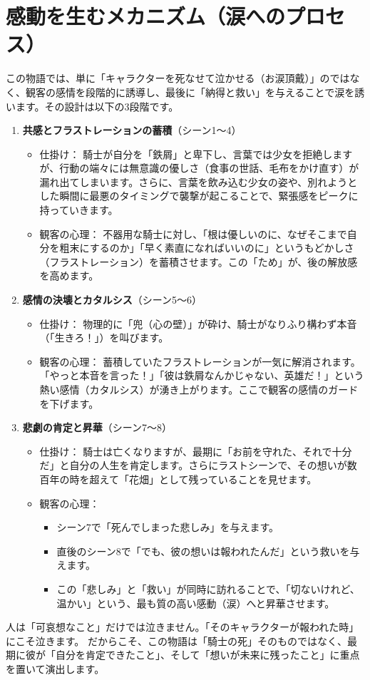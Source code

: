 \clearpage\section{感動を生むメカニズム（涙へのプロセス）}
この物語では、単に「キャラクターを死なせて泣かせる（お涙頂戴）」のではなく、観客の感情を段階的に誘導し、最後に「納得と救い」を与えることで涙を誘います。その設計は以下の3段階です。
\begin{enumerate}
    \item \textbf{共感とフラストレーションの蓄積}（シーン1〜4）
    \begin{itemize}
        \item 仕掛け： 騎士が自分を「鉄屑」と卑下し、言葉では少女を拒絶しますが、行動の端々には無意識の優しさ（食事の世話、毛布をかけ直す）が漏れ出てしまいます。さらに、言葉を飲み込む少女の姿や、別れようとした瞬間に最悪のタイミングで襲撃が起こることで、緊張感をピークに持っていきます。
        \item 観客の心理： 不器用な騎士に対し、「根は優しいのに、なぜそこまで自分を粗末にするのか」「早く素直になればいいのに」というもどかしさ（フラストレーション）を蓄積させます。この「ため」が、後の解放感を高めます。
    \end{itemize}
    \item \textbf{感情の決壊とカタルシス}（シーン5〜6）
    \begin{itemize}
        \item 仕掛け： 物理的に「兜（心の壁）」が砕け、騎士がなりふり構わず本音（「生きろ！」）を叫びます。
        \item 観客の心理： 蓄積していたフラストレーションが一気に解消されます。「やっと本音を言った！」「彼は鉄屑なんかじゃない、英雄だ！」という熱い感情（カタルシス）が湧き上がります。ここで観客の感情のガードを下げます。
    \end{itemize}
    \item \textbf{悲劇の肯定と昇華}（シーン7〜8）
    \begin{itemize}
        \item 仕掛け： 騎士は亡くなりますが、最期に「お前を守れた、それで十分だ」と自分の人生を肯定します。さらにラストシーンで、その想いが数百年の時を超えて「花畑」として残っていることを見せます。
        \item 観客の心理：
        \begin{itemize}
            \item シーン7で「死んでしまった悲しみ」を与えます。
            \item 直後のシーン8で「でも、彼の想いは報われたんだ」という救いを与えます。
            \item この「悲しみ」と「救い」が同時に訪れることで、「切ないけれど、温かい」という、最も質の高い感動（涙）へと昇華させます。
        \end{itemize}
    \end{itemize}
\end{enumerate}
人は「可哀想なこと」だけでは泣きません。「そのキャラクターが報われた時」にこそ泣きます。
だからこそ、この物語は「騎士の死」そのものではなく、最期に彼が「自分を肯定できたこと」、そして「想いが未来に残ったこと」に重点を置いて演出します。

